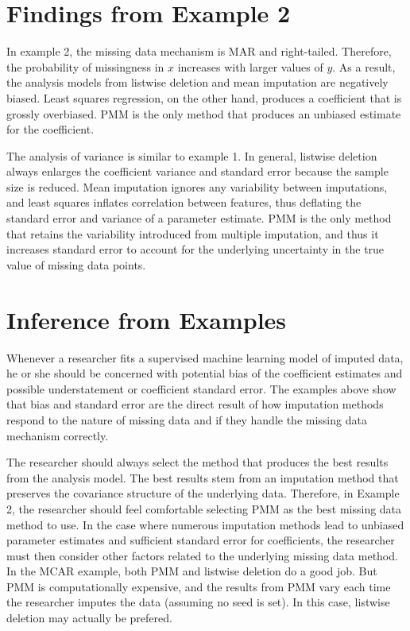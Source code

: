\documentclass[12pt,oneside]{chicagocapstone}
\begin{document}
\section*{Findings from Example 2}\label{findings-from-example-2}

In example 2, the missing data mechanism is MAR and right-tailed.
Therefore, the probability of missingness in \(x\) increases with larger
values of \(y\). As a result, the analysis models from listwise deletion
and mean imputation are negatively biased. Least squares regression, on
the other hand, produces a coefficient that is grossly overbiased. PMM
is the only method that produces an unbiased estimate for the
coefficient.

The analysis of variance is similar to example 1. In general, listwise
deletion always enlarges the coefficient variance and standard error
because the sample size is reduced. Mean imputation ignores any
variability between imputations, and least squares inflates correlation
between features, thus deflating the standard error and variance of a
parameter estimate. PMM is the only method that retains the variability
introduced from multiple imputation, and thus it increases standard
error to account for the underlying uncertainty in the true value of
missing data points.

\section*{Inference from Examples}\label{inference-from-examples}

Whenever a researcher fits a supervised machine learning model of
imputed data, he or she should be concerned with potential bias of the
coefficient estimates and possible understatement or coefficient
standard error. The examples above show that bias and standard error are
the direct result of how imputation methods respond to the nature of
missing data and if they handle the missing data mechanism correctly.

The researcher should always select the method that produces the best
results from the analysis model. The best results stem from an
imputation method that preserves the covariance structure of the
underlying data. Therefore, in Example 2, the researcher should feel
comfortable selecting PMM as the best missing data method to use. In the
case where numerous imputation methods lead to unbiased parameter
estimates and sufficient standard error for coefficients, the researcher
must then consider other factors related to the underlying missing data
method. In the MCAR example, both PMM and listwise deletion do a good
job. But PMM is computationally expensive, and the results from PMM vary
each time the researcher imputes the data (assuming no seed is set). In
this case, listwise deletion may actually be prefered.
\end{document}
